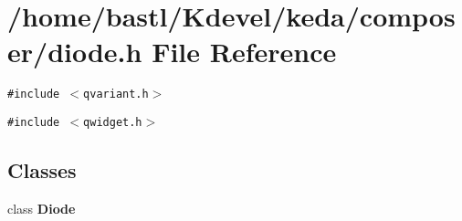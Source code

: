 \section{/home/bastl/Kdevel/keda/composer/diode.h File Reference}
\label{diode_8h}
{\tt \#include $<$qvariant.h$>$}\par
{\tt \#include $<$qwidget.h$>$}\par
\subsection*{Classes}
\begin{CompactItemize}
\item 
class {\bf Diode}
\end{CompactItemize}
